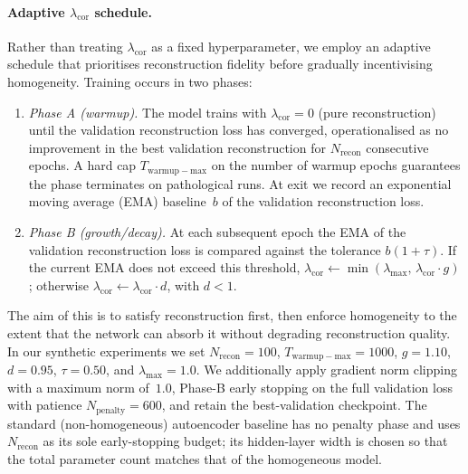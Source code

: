 \documentclass{article}
\theoremstyle{definition}
\begin{document}
\paragraph{Adaptive $\lambda_{\mathrm{cor}}$ schedule.}
Rather than treating $\lambda_{\mathrm{cor}}$ as a fixed hyperparameter, we employ an adaptive schedule that prioritises reconstruction fidelity before gradually incentivising homogeneity.  Training occurs in two phases:
\begin{enumerate}
    \item \emph{Phase A (warmup).} The model trains with $\lambda_{\mathrm{cor}} = 0$ (pure reconstruction) until the validation reconstruction loss has converged, operationalised as no improvement in the best validation reconstruction for $N_{\mathrm{recon}}$ consecutive epochs.  A hard cap $T_{\mathrm{warmup-max}}$ on the number of warmup epochs guarantees the phase terminates on pathological runs.  At exit we record an exponential moving average (EMA) baseline~$b$ of the validation reconstruction loss.
    \item \emph{Phase B (growth/decay).} At each subsequent epoch the EMA of the validation reconstruction loss is compared against the tolerance $b(1 + \tau)$.  If the current EMA does not exceed this threshold, $\lambda_{\mathrm{cor}} \leftarrow \min(\lambda_{\max},\, \lambda_{\mathrm{cor}} \cdot g)$; otherwise $\lambda_{\mathrm{cor}} \leftarrow \lambda_{\mathrm{cor}} \cdot d$, with $d < 1$.
\end{enumerate}
The aim of this is to satisfy reconstruction first, then enforce homogeneity to the extent that the network can absorb it without degrading reconstruction quality.  In our synthetic experiments we set $N_{\mathrm{recon}} = 100$, $T_{\mathrm{warmup-max}} = 1000$, $g = 1.10$, $d = 0.95$, $\tau = 0.50$, and $\lambda_{\max} = 1.0$.  We additionally apply gradient norm clipping with a maximum norm of~$1.0$, Phase-B early stopping on the full validation loss with patience $N_{\mathrm{penalty}} = 600$, and retain the best-validation checkpoint.  The standard (non-homogeneous) autoencoder baseline has no penalty phase and uses $N_{\mathrm{recon}}$ as its sole early-stopping budget; its hidden-layer width is chosen so that the total parameter count matches that of the homogeneous model.
\end{document}

